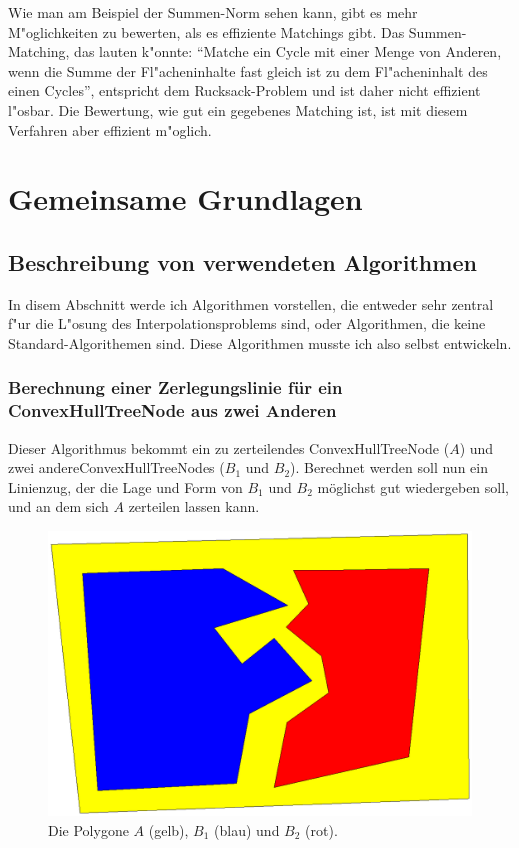 Wie man am Beispiel der Summen-Norm sehen kann, gibt es mehr M"oglichkeiten zu bewerten, als es effiziente Matchings gibt. Das Summen-Matching, das lauten k"onnte: "`Matche ein Cycle mit  einer Menge von Anderen, wenn die Summe der Fl"acheninhalte fast gleich ist zu dem Fl"acheninhalt des einen Cycles"', entspricht dem Rucksack-Problem und ist daher nicht effizient l"osbar. Die Bewertung, wie gut ein gegebenes Matching ist, ist mit diesem Verfahren aber effizient m"oglich.

\section{Gemeinsame Grundlagen }

\subsection{Beschreibung von verwendeten Algorithmen}
In disem Abschnitt werde ich Algorithmen vorstellen, die entweder sehr zentral f"ur die L"osung des Interpolationsproblems sind, oder Algorithmen, die keine Standard-Algorithemen sind. Diese Algorithmen musste ich also selbst entwickeln.

\subsubsection{Berechnung einer Zerlegungslinie für ein ConvexHullTreeNode aus zwei Anderen}\label{ZerteilungsAlgo}

Dieser Algorithmus bekommt ein zu zerteilendes ConvexHullTreeNode ($A$) und zwei andereConvexHullTreeNodes ($B_1$ und $B_2$). Berechnet werden soll nun ein Linienzug, der die Lage und Form von $B_1$ und $B_2$ möglichst gut wiedergeben soll, und an dem sich $A$ zerteilen lassen kann.

\begin{figure}
	\centering
	\includegraphics[scale=0.6]{ZuZersplitten.eps}
	\caption[Zu teilendes Polygon mit Referenzpolygonen]{Die Polygone $A$ (gelb), $B_1$ (blau) und $B_2$ (rot).}
	\label{fig:ZuZersplitten}
\end{figure}

